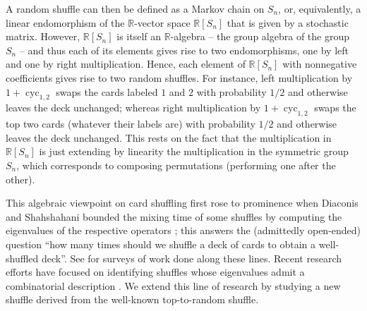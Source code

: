 \documentclass[12pt]{article}
\theoremstyle{definition}%
\theoremstyle{definition}%
\theoremstyle{remark}%
\newcommand{\tup}[1]{\left( #1 \right)}
\newcommand{\cyc}[1]{\operatorname{cyc}_{#1}}
\newcommand{\RR}{\mathbb{R}}
\begin{document}
A random shuffle can then be defined as a Markov chain on $S_n$, or, equivalently, a linear endomorphism of the $\RR$-vector space $\RR[S_n]$ that is given by a stochastic matrix.
However, $\RR[S_n]$ is itself an $\RR$-algebra -- the group algebra of the group $S_n$ -- and thus each of its elements gives rise to two endomorphisms, one by left and one by right multiplication.
Hence, each element of $\RR[S_n]$ with nonnegative coefficients gives rise to two random shuffles.
For instance, left multiplication by $1 + \cyc{1,2}$ swaps the cards labeled $1$ and $2$ with probability $1/2$ and otherwise leaves the deck unchanged; whereas right multiplication by $1 + \cyc{1,2}$ swaps the top two cards (whatever their labels are) with probability $1/2$ and otherwise leaves the deck unchanged.
This rests on the fact that the multiplication in $\RR[S_n]$ is just extending by linearity the multiplication in the symmetric group $S_n$, which corresponds to composing permutations (performing one after the other).





This algebraic viewpoint on card shuffling first rose to prominence when Diaconis and Shahshahani bounded the mixing time of some shuffles by computing the eigenvalues of the respective operators \cite{DiaSha81}; this answers the (admittedly open-ended) question ``how many times should we shuffle a deck of cards to obtain a well-shuffled deck''.
See \cite{DiaconisFulman,Diaconis03} for surveys of work done along these lines.
Recent research efforts have focused on identifying shuffles whose eigenvalues admit a combinatorial description \cite{GriLaf22, DiaSha81, Phatar91, DieSal18}.
We extend this line of research by studying a new shuffle derived from the well-known top-to-random shuffle.
\end{document}
